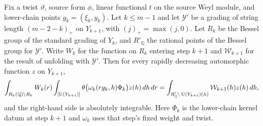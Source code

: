 \begin{lemma}
\label{lem:a-seesaw-single-stage}
\emitthmsource
Fix a twist $\vartheta$, source form $\phi$, linear functional $t$ on the source Weyl module, and lower-chain points $g_k=(\xi_k,y_k)$. Let $k\le m-1$ and let $\mathcal Y'$ be a grading of string length $(m-2-k)_+$ on $Y_{k+1}$, with $(j)_+=\max(j,0)$. Let $R_k$ be the Bessel group of the standard grading of $Y_k$, and $R'_{\mathbb Q}$ the rational points of the Bessel group for $\mathcal Y'$. Write $W_k$ for the function on $R_k$ entering step $k+1$ and $\mathcal W_{k+1}$ for the result of unfolding with $\mathcal Y'$. Then for every rapidly decreasing automorphic function $z$ on $Y_{k+1}$,
\[
 \int_{R_k(\mathbb Q)\backslash R_k} W_k(r)
 \int_{[\operatorname{U}(Y_{k+1})]}
  \theta\bigl(\omega_k(rg_k,h)\Phi_k\bigr)z(h)\,dh\,dr
 =
 \int_{R'_{\mathbb Q}\backslash \operatorname{U}(Y_{k+1})(\mathbb A)}
    \mathcal W_{k+1}(h)z(h)\,dh ,
\]
and the right-hand side is absolutely integrable. Here $\Phi_k$ is the lower-chain kernel datum at step $k+1$ and $\omega_k$ uses that step's fixed weight and twist.
\end{lemma}
